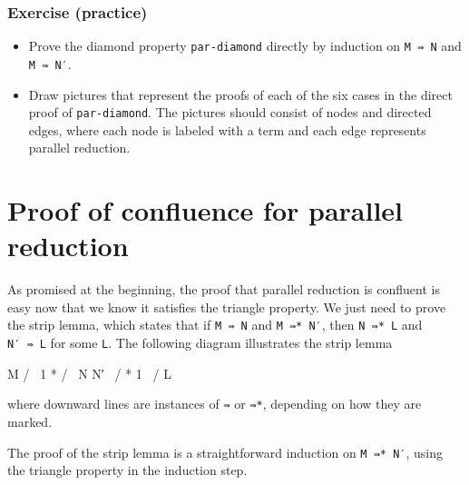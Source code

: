 \hypertarget{exercise-practice}{%
\subsubsection{Exercise (practice)}\label{exercise-practice}}

\begin{itemize}
\item
  Prove the diamond property \texttt{par-diamond} directly by induction
  on \texttt{M\ ⇛\ N} and \texttt{M\ ⇛\ N′}.
\item
  Draw pictures that represent the proofs of each of the six cases in
  the direct proof of \texttt{par-diamond}. The pictures should consist
  of nodes and directed edges, where each node is labeled with a term
  and each edge represents parallel reduction.
\end{itemize}

\hypertarget{proof-of-confluence-for-parallel-reduction}{%
\section{Proof of confluence for parallel
reduction}\label{proof-of-confluence-for-parallel-reduction}}

As promised at the beginning, the proof that parallel reduction is
confluent is easy now that we know it satisfies the triangle property.
We just need to prove the strip lemma, which states that if
\texttt{M\ ⇛\ N} and \texttt{M\ ⇛*\ N′}, then \texttt{N\ ⇛*\ L} and
\texttt{N′\ ⇛\ L} for some \texttt{L}. The following diagram illustrates
the strip lemma

\begin{myDisplay}
    M
   / \
  1   *
 /     \
N       N′
 \     /
  *   1
   \ /
    L
\end{myDisplay}

where downward lines are instances of \texttt{⇛} or \texttt{⇛*},
depending on how they are marked.

The proof of the strip lemma is a straightforward induction on
\texttt{M\ ⇛*\ N′}, using the triangle property in the induction step.

